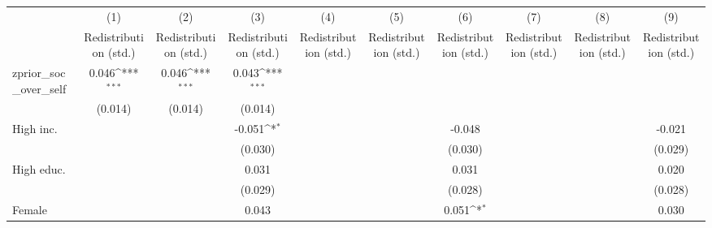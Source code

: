 {
\def\sym#1{\ifmmode^{#1}\else\(^{#1}\)\fi}
\begin{tabular}{l*{9}{c}}
\toprule
                    &\multicolumn{1}{c}{(1)}&\multicolumn{1}{c}{(2)}&\multicolumn{1}{c}{(3)}&\multicolumn{1}{c}{(4)}&\multicolumn{1}{c}{(5)}&\multicolumn{1}{c}{(6)}&\multicolumn{1}{c}{(7)}&\multicolumn{1}{c}{(8)}&\multicolumn{1}{c}{(9)}\\
                    &\multicolumn{1}{c}{Redistribution (std.)}&\multicolumn{1}{c}{Redistribution (std.)}&\multicolumn{1}{c}{Redistribution (std.)}&\multicolumn{1}{c}{Redistribution (std.)}&\multicolumn{1}{c}{Redistribution (std.)}&\multicolumn{1}{c}{Redistribution (std.)}&\multicolumn{1}{c}{Redistribution (std.)}&\multicolumn{1}{c}{Redistribution (std.)}&\multicolumn{1}{c}{Redistribution (std.)}\\
\midrule
zprior\_soc\_over\_self&       0.046\sym{***}&       0.046\sym{***}&       0.043\sym{***}&                     &                     &                     &                     &                     &                     \\
                    &     (0.014)         &     (0.014)         &     (0.014)         &                     &                     &                     &                     &                     &                     \\
\addlinespace
High inc.           &                     &                     &      -0.051\sym{*}  &                     &                     &      -0.048         &                     &                     &      -0.021         \\
                    &                     &                     &     (0.030)         &                     &                     &     (0.030)         &                     &                     &     (0.029)         \\
\addlinespace
High educ.          &                     &                     &       0.031         &                     &                     &       0.031         &                     &                     &       0.020         \\
                    &                     &                     &     (0.029)         &                     &                     &     (0.028)         &                     &                     &     (0.028)         \\
\addlinespace
Female              &                     &                     &       0.043         &                     &                     &       0.051\sym{*}  &                     &                     &       0.030         \\

\end{tabular}}
